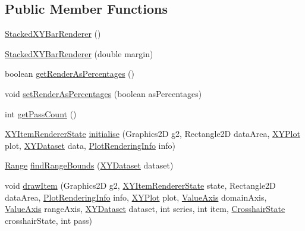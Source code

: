 \subsection*{Public Member Functions}
\begin{DoxyCompactItemize}
\item 
\mbox{\hyperlink{classorg_1_1jfree_1_1chart_1_1renderer_1_1xy_1_1_stacked_x_y_bar_renderer_a48feeedc28faecf6ecab5df85003e00d}{Stacked\+X\+Y\+Bar\+Renderer}} ()
\item 
\mbox{\hyperlink{classorg_1_1jfree_1_1chart_1_1renderer_1_1xy_1_1_stacked_x_y_bar_renderer_a97efcf41b18b8603f3a42b6f0d848412}{Stacked\+X\+Y\+Bar\+Renderer}} (double margin)
\item 
boolean \mbox{\hyperlink{classorg_1_1jfree_1_1chart_1_1renderer_1_1xy_1_1_stacked_x_y_bar_renderer_ad437247972955413d47d6d40323fbe20}{get\+Render\+As\+Percentages}} ()
\item 
void \mbox{\hyperlink{classorg_1_1jfree_1_1chart_1_1renderer_1_1xy_1_1_stacked_x_y_bar_renderer_ae62cf723289c7712a317e1ef8132cefd}{set\+Render\+As\+Percentages}} (boolean as\+Percentages)
\item 
int \mbox{\hyperlink{classorg_1_1jfree_1_1chart_1_1renderer_1_1xy_1_1_stacked_x_y_bar_renderer_aa9ed2c3310400d9da9a9e3e2c7f719f1}{get\+Pass\+Count}} ()
\item 
\mbox{\hyperlink{classorg_1_1jfree_1_1chart_1_1renderer_1_1xy_1_1_x_y_item_renderer_state}{X\+Y\+Item\+Renderer\+State}} \mbox{\hyperlink{classorg_1_1jfree_1_1chart_1_1renderer_1_1xy_1_1_stacked_x_y_bar_renderer_adff6241ebd96bf8e25101cc9684f5afd}{initialise}} (Graphics2D g2, Rectangle2D data\+Area, \mbox{\hyperlink{classorg_1_1jfree_1_1chart_1_1plot_1_1_x_y_plot}{X\+Y\+Plot}} plot, \mbox{\hyperlink{interfaceorg_1_1jfree_1_1data_1_1xy_1_1_x_y_dataset}{X\+Y\+Dataset}} data, \mbox{\hyperlink{classorg_1_1jfree_1_1chart_1_1plot_1_1_plot_rendering_info}{Plot\+Rendering\+Info}} info)
\item 
\mbox{\hyperlink{classorg_1_1jfree_1_1data_1_1_range}{Range}} \mbox{\hyperlink{classorg_1_1jfree_1_1chart_1_1renderer_1_1xy_1_1_stacked_x_y_bar_renderer_a3d3f95bf3ab4db2209bf36862ab96d5b}{find\+Range\+Bounds}} (\mbox{\hyperlink{interfaceorg_1_1jfree_1_1data_1_1xy_1_1_x_y_dataset}{X\+Y\+Dataset}} dataset)
\item 
void \mbox{\hyperlink{classorg_1_1jfree_1_1chart_1_1renderer_1_1xy_1_1_stacked_x_y_bar_renderer_a9fd2304b638c968d23773a3ccf2c8d39}{draw\+Item}} (Graphics2D g2, \mbox{\hyperlink{classorg_1_1jfree_1_1chart_1_1renderer_1_1xy_1_1_x_y_item_renderer_state}{X\+Y\+Item\+Renderer\+State}} state, Rectangle2D data\+Area, \mbox{\hyperlink{classorg_1_1jfree_1_1chart_1_1plot_1_1_plot_rendering_info}{Plot\+Rendering\+Info}} info, \mbox{\hyperlink{classorg_1_1jfree_1_1chart_1_1plot_1_1_x_y_plot}{X\+Y\+Plot}} plot, \mbox{\hyperlink{classorg_1_1jfree_1_1chart_1_1axis_1_1_value_axis}{Value\+Axis}} domain\+Axis, \mbox{\hyperlink{classorg_1_1jfree_1_1chart_1_1axis_1_1_value_axis}{Value\+Axis}} range\+Axis, \mbox{\hyperlink{interfaceorg_1_1jfree_1_1data_1_1xy_1_1_x_y_dataset}{X\+Y\+Dataset}} dataset, int series, int item, \mbox{\hyperlink{classorg_1_1jfree_1_1chart_1_1plot_1_1_crosshair_state}{Crosshair\+State}} crosshair\+State, int pass)

\end{DoxyCompactItemize}
